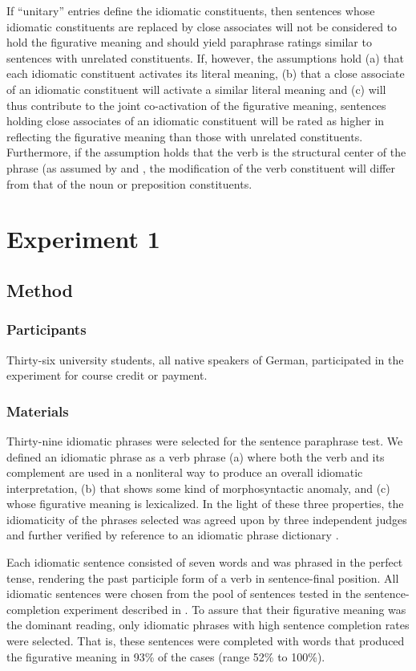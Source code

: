 \documentclass[output=paper]{langsci/langscibook}
\begin{document}
If ``unitary'' entries define the idiomatic constituents, then sentences whose idiomatic constituents are replaced by close associates will not be considered to hold the figurative meaning and should yield paraphrase ratings similar to sentences with unrelated constituents. If, however, the assumptions hold (a) that each idiomatic constituent activates its literal meaning, (b) that a close associate of an idiomatic constituent will activate a similar literal meaning and (c) will thus contribute to the joint co-activation of the figurative meaning, sentences holding close associates of an idiomatic constituent will be rated as higher in reflecting the figurative meaning than those with unrelated constituents. Furthermore, if the assumption holds that the verb is the structural center of the phrase (as assumed by \citealt{rabanus:2008} and \citealt{smolka:2007}, the modification of the verb constituent will differ from that of the noun or preposition constituents. 

\section{Experiment 1}

\subsection{Method}
\subsubsection{Participants}
Thirty-six university students, all native speakers of German, participated in the experiment for course credit or payment.

\subsubsection{Materials}
Thirty-nine idiomatic phrases were selected for the sentence paraphrase test. We defined an idiomatic phrase as a verb phrase (a) where both the verb and its complement are used in a nonliteral way to produce an overall idiomatic interpretation, (b) that shows some kind of morphosyntactic anomaly, and (c) whose figurative meaning is lexicalized.  In the light of these three properties, the idiomaticity of the phrases selected was agreed upon by three independent judges and further verified by reference to an idiomatic phrase dictionary \citep{redewendungen:2002}.

Each idiomatic sentence consisted of seven words and was phrased in the perfect tense, rendering the past participle form of a verb in sentence-final position. All idiomatic sentences were chosen from the pool of sentences tested in the sentence-completion experiment described in \citet{smolka:2007}. To assure that their figurative meaning was the dominant reading, only idiomatic phrases with high sentence completion rates were selected. That is, these sentences were completed with words that produced the figurative meaning in 93\% of the cases (range 52\% to 100\%).
\end{document}
